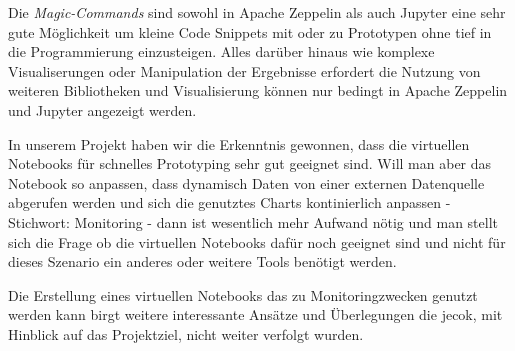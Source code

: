 Die \textit{Magic-Commands} sind sowohl in Apache Zeppelin als auch Jupyter eine sehr gute Möglichkeit um kleine Code Snippets mit  oder  zu Prototypen ohne tief in die Programmierung einzusteigen.
Alles darüber hinaus wie komplexe Visualiserungen oder Manipulation der Ergebnisse erfordert die Nutzung von weiteren Bibliotheken und
Visualisierung können nur bedingt in Apache Zeppelin und Jupyter angezeigt werden.

In unserem Projekt haben wir die Erkenntnis gewonnen, dass die virtuellen Notebooks für schnelles Prototyping sehr gut geeignet sind.
Will man aber das Notebook so anpassen, dass \zb{} dynamisch Daten von einer externen Datenquelle abgerufen werden
und sich die genutztes Charts kontinierlich anpassen - Stichwort: Monitoring - dann ist wesentlich mehr Aufwand nötig und man stellt sich die
Frage ob die virtuellen Notebooks dafür noch geeignet sind und nicht für dieses Szenario ein anderes oder weitere Tools benötigt werden.

Die Erstellung eines virtuellen Notebooks das zu Monitoringzwecken genutzt werden kann birgt weitere interessante Ansätze und Überlegungen die
jecok, mit Hinblick auf das Projektziel, nicht weiter verfolgt wurden.
